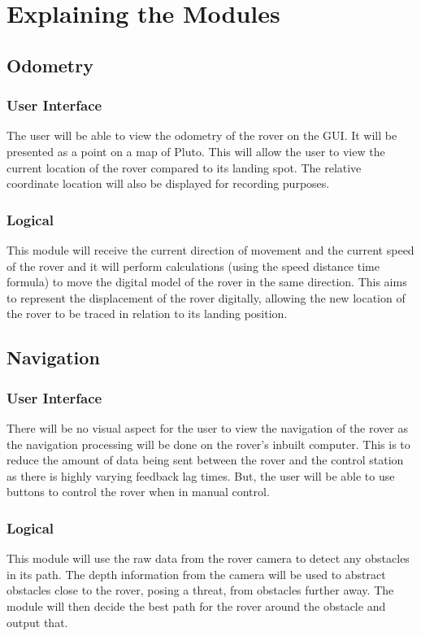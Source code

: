 \documentclass[11pt]{report}
\begin{document}
\section{Explaining the Modules}

\subsection{Odometry}
\subsubsection{\normalfont User Interface}
The user will be able to view the odometry of the rover on the GUI. It will be presented as a point on a map of Pluto. This will allow the user to view the current location of the rover compared to its landing spot. The relative coordinate location will also be displayed for recording purposes.
\subsubsection{\normalfont Logical}
This module will receive the current direction of movement and the current speed of the rover and it will perform calculations (using the speed distance time formula) to move the digital model of the rover in the same direction. This aims to represent the displacement of the rover digitally, allowing the new location of the rover to be traced in relation to its landing position.

\subsection{Navigation}
\subsubsection{\normalfont User Interface}
There will be no visual aspect for the user to view the navigation of the rover as the navigation processing will be done on the rover's inbuilt computer. This is to reduce the amount of data being sent between the rover and the control station as there is highly varying feedback lag times. But, the user will be able to use buttons to control the rover when in manual control. 
\subsubsection{\normalfont Logical}
This module will use the raw data from the rover camera to detect any obstacles in its path. The depth information from the camera will be used to abstract obstacles close to the rover, posing a threat, from obstacles further away. The module will then decide the best path for the rover around the obstacle and output that.
\end{document}
